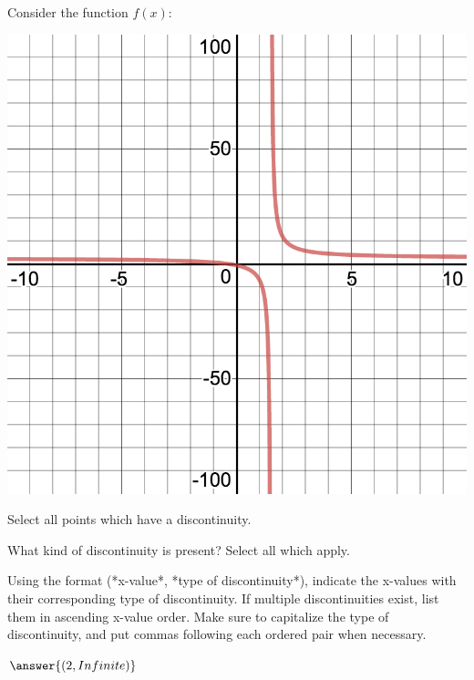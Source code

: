 \documentclass{ximera}
\begin{document}
\begin{question}
Consider the function $f(x)$:
\begin{image}
\includegraphics{continuity3}
\end{image}
Select all points which have a discontinuity.

\begin{selectAll}
\end{selectAll}

What kind of discontinuity is present? Select all which apply.

\begin{selectAll}
\end{selectAll}

Using the format (*x-value*, *type of discontinuity*), indicate the x-values with their corresponding type of discontinuity. If multiple discontinuities exist, list them in ascending x-value order. Make sure to capitalize the type of discontinuity, and put commas following each ordered pair when necessary.

$\answer{(2, Infinite)}$
\end{question}
\end{document}
